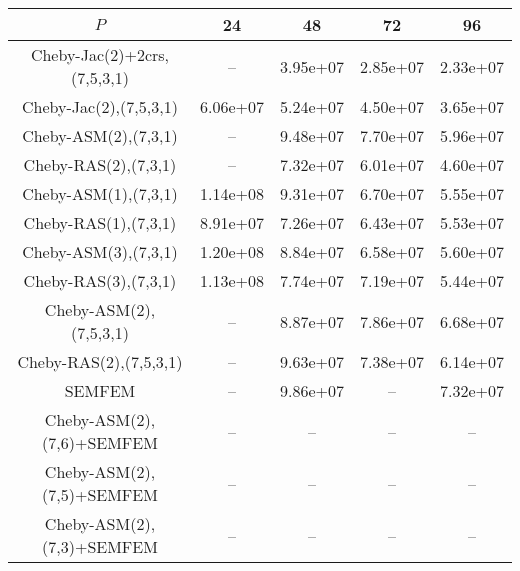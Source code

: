 \begin{table*}
\centering
\begin{tabular}{||c||cccc||}
	\hline
	$P$ & 24 & 48 & 72 & 96 \\
	\hline\hline
	Cheby-Jac(2)+2crs,(7,5,3,1)	&	 --	&	3.95e+07	&	2.85e+07	&	2.33e+07\\
	Cheby-Jac(2),(7,5,3,1)	&	6.06e+07	&	5.24e+07	&	4.50e+07	&	3.65e+07\\
	Cheby-ASM(2),(7,3,1)	&	 --	&	9.48e+07	&	7.70e+07	&	5.96e+07\\
	Cheby-RAS(2),(7,3,1)	&	 --	&	7.32e+07	&	6.01e+07	&	4.60e+07\\
	Cheby-ASM(1),(7,3,1)	&	1.14e+08	&	9.31e+07	&	6.70e+07	&	5.55e+07\\
	Cheby-RAS(1),(7,3,1)	&	8.91e+07	&	7.26e+07	&	6.43e+07	&	5.53e+07\\
	Cheby-ASM(3),(7,3,1)	&	1.20e+08	&	8.84e+07	&	6.58e+07	&	5.60e+07\\
	Cheby-RAS(3),(7,3,1)	&	1.13e+08	&	7.74e+07	&	7.19e+07	&	5.44e+07\\
	Cheby-ASM(2),(7,5,3,1)	&	 --	&	8.87e+07	&	7.86e+07	&	6.68e+07\\
	Cheby-RAS(2),(7,5,3,1)	&	 --	&	9.63e+07	&	7.38e+07	&	6.14e+07\\
	SEMFEM	&	 --	&	9.86e+07	&	 --	&	7.32e+07\\
	Cheby-ASM(2),(7,6)+SEMFEM	&	 --	&	 --	&	 --	&	 --\\
	Cheby-ASM(2),(7,5)+SEMFEM	&	 --	&	 --	&	 --	&	 --\\
	Cheby-ASM(2),(7,3)+SEMFEM	&	 --	&	 --	&	 --	&	 --\\
\hline
\end{tabular}
\caption{\label{table:foobar}}
\end{table*}
